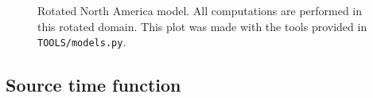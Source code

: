 \begin{center}
\begin{figure}
\center{} 
\caption{Rotated North America model. All computations are performed in this rotated domain. This plot was made with the tools provided in \texttt{TOOLS/models.py}.}\label{F:NA2}
\end{figure}
\end{center}

\subsection{Source time function}\label{S:stf_NA}

